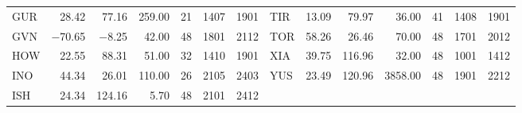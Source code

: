 \begin{table}[ht]
\begin{tabular}{lrrrccclrrrccc}
  GUR & 28.42 & 77.16 & 259.00 &  21 & 1407 & 1901 & TIR & 13.09 & 79.97 & 36.00 &  41 & 1408 & 1901 \\ 
  GVN & $-$70.65 & $-$8.25 & 42.00 &  48 & 1801 & 2112 & TOR & 58.26 & 26.46 & 70.00 &  48 & 1701 & 2012 \\ 
  HOW & 22.55 & 88.31 & 51.00 &  32 & 1410 & 1901 & XIA & 39.75 & 116.96 & 32.00 &  48 & 1001 & 1412 \\ 
  INO & 44.34 & 26.01 & 110.00 &  26 & 2105 & 2403 & YUS & 23.49 & 120.96 & 3858.00 &  48 & 1901 & 2212 \\ 
  ISH & 24.34 & 124.16 & 5.70 &  48 & 2101 & 2412 &  &  &  &  &  &  &  \\ 
   \bottomrule
\end{tabular}
\end{table}
